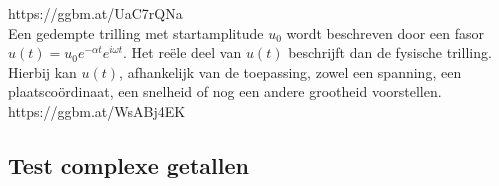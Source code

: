 https://ggbm.at/UaC7rQNa     \\

Een gedempte trilling met startamplitude $u_{0}$ wordt beschreven door een fasor $u(t)=u_{0}e^{-\alpha t}e^{i\omega t}$. Het re\"{e}le deel van $u(t)$ beschrijft dan de fysische trilling. Hierbij kan $u(t)$, afhankelijk van de toepassing, zowel een spanning, een plaatsco\"{o}rdinaat, een snelheid of nog een andere grootheid voorstellen.\\

https://ggbm.at/WsABj4EK   \\

\subsection{Test complexe getallen}